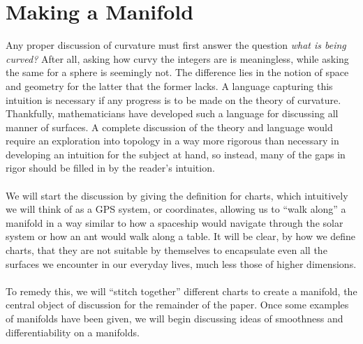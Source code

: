 \documentclass[]{article}
\newcommand\<{\ensuremath{\left\langle}}
\renewcommand\>{\ensuremath{\right\rangle}}
\theoremstyle{definition}
\theoremstyle{definition}
\begin{document}
	\section{Making a Manifold}
	Any proper discussion of curvature must first answer the question \textit{what is being curved?} After all, asking how curvy the integers are is meaningless, while asking the same for a sphere is seemingly not. The difference lies in the notion of space and geometry for the latter that the former lacks. A language capturing this intuition is necessary if any progress is to be made on the theory of curvature. Thankfully, mathematicians have developed such a language for discussing all manner of surfaces. A complete discussion of the theory and language would require an exploration into topology in a way more rigorous than necessary in developing an intuition for the subject at hand, so instead, many of the gaps in rigor should be filled in by the reader's intuition.\\
	\\
	We will start the discussion by giving the definition for charts, which intuitively we will think of as a GPS system, or coordinates, allowing us to ``walk along'' a manifold in a way similar to how a spaceship would navigate through the solar system or how an ant would walk along a table. It will be clear, by how we define charts, that they are not suitable by themselves to encapsulate even all the surfaces we encounter in our everyday lives, much less those of higher dimensions. \\
	\\
	To remedy this, we will ``stitch together'' different charts to create a manifold, the central object of discussion for the remainder of the paper. Once some examples of manifolds have been given, we will begin discussing ideas of smoothness and differentiability on a manifolds.
\end{document}
